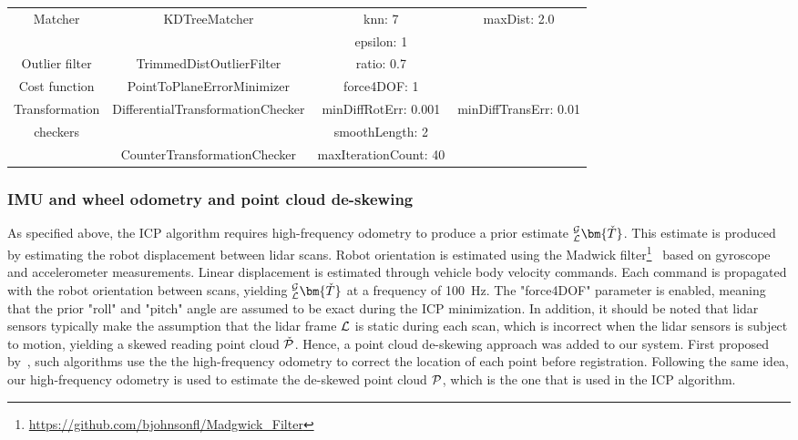 \begin{table}[htpb]
\begin{center}
\begin{tabular}{c c c c}
			\midrule
			Matcher        & KDTreeMatcher                     & knn: 7                & maxDist: 2.0          \\
			               &                                   & epsilon: 1                                    \\
			\midrule
			Outlier filter & TrimmedDistOutlierFilter          & ratio: 0.7            &                       \\
			\midrule
			Cost function  & PointToPlaneErrorMinimizer        & force4DOF: 1          &                       \\
			\midrule
			Transformation & DifferentialTransformationChecker & minDiffRotErr: 0.001  & minDiffTransErr: 0.01 \\
			checkers       &                                   & smoothLength: 2                               \\
			               & CounterTransformationChecker      & maxIterationCount: 40                         \\
			\bottomrule
		\end{tabular}
	\end{center}
	\label{tab:icp_params}
\end{table}

\subsubsection{\ac{IMU} and wheel odometry and point cloud de-skewing}
\label{sec:imu_wheel_odom}

As specified above, the \ac{ICP} algorithm requires high-frequency odometry to produce a prior estimate $_{\lidarf}^{\mapf}\bm{\check{T}}$.
This estimate is produced by estimating the robot displacement between lidar scans.
Robot orientation is estimated using the Madwick filter\footnote{\url{https://github.com/bjohnsonfl/Madgwick_Filter}}~\citep{Madgwick2011} based on gyroscope and accelerometer measurements.
Linear displacement is estimated through vehicle body velocity commands.
Each command is propagated with the robot orientation between scans, yielding $_{\lidarf}^{\mapf}\bm{\check{T}}$ at a frequency of \SI{100}{Hz}.
The "force4DOF" parameter is enabled, meaning that the prior "roll" and "pitch" angle are assumed to be exact during the \ac{ICP} minimization.
In addition, it should be noted that lidar sensors typically make the assumption that the lidar frame $\mathcal{L}$ is static during each scan, which is incorrect when the lidar sensors is subject to motion, yielding a skewed reading point cloud $\check{\mathcal{P}}$.
Hence, a point cloud de-skewing approach was added to our system.
First proposed by~\citet{Bosse2009}, such algorithms use the the high-frequency odometry to correct the location of each point before registration.
Following the same idea, our high-frequency odometry is used to estimate the de-skewed point cloud $\mathcal{P}$, which is the one that is used in the \ac{ICP} algorithm.


